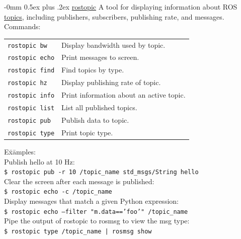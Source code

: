 \documentclass[10pt,landscape]{article}
\makeatletter
\renewcommand{\subsection}{\@startsection{subsection}{2}{0mm}%
                                {-0mm}%
                                {0.5ex plus .2ex}%
                                {\normalfont\normalsize\bfseries}}
\newenvironment{nstabbing}
  {\setlength{\topsep}{1pt}%
   \setlength{\partopsep}{1pt}%
   \tabbing}
  {\endtabbing}
\makeatother
\begin{document}
\begin{multicols}{3}
\subsection{\href{http://wiki.ros.org/rostopic}{rostopic}}
A tool for displaying information about ROS \href{http://wiki.ros.org/Topics}{topics}, including publishers, subscribers, publishing rate, and messages.\\
Commands: \\
\begin{tabular}{p{\the\MyLen}%
                @{}p{\linewidth-\the\MyLen}@{}}
\texttt{rostopic bw}     & Display bandwidth used by topic. \\
\texttt{rostopic echo}   & Print messages to screen. \\
\texttt{rostopic find}   & Find topics by type. \\
\texttt{rostopic hz}     & Display publishing rate of topic. \\
\texttt{rostopic info}   & Print information about an active topic. \\
\texttt{rostopic list}   & List all published topics. \\
\texttt{rostopic pub}    & Publish data to topic. \\
\texttt{rostopic type}   & Print topic type. \\
\end{tabular}
\begin{nstabbing}
E\=x\=amples:\\
\> Publish hello at 10 Hz:\\
\> \>\texttt{\$ rostopic pub -r 10 /topic\_name std\_msgs/String hello}\\
\> Clear the screen after each message is published:\\
\> \>\texttt{\$ rostopic echo -c /topic\_name}\\
\> Display messages that match a given Python expression:\\
\> \>\texttt{\$ rostopic echo --filter "m.data=='foo'"  /topic\_name}\\
\> Pipe the output of rostopic to rosmsg to view the msg type:\\
\> \>\texttt{\$ rostopic type /topic\_name | rosmsg show}
\end{nstabbing}


\end{multicols}
\end{document}
